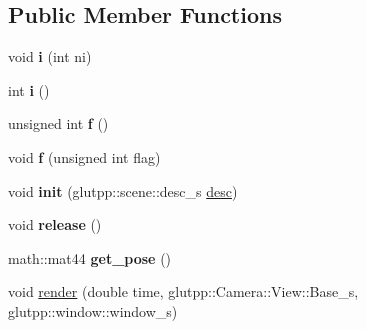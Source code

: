\subsection*{\-Public \-Member \-Functions}
\begin{DoxyCompactItemize}
\item 
\hypertarget{classglutpp_1_1scene_1_1scene_abe1fa6d1512bfd84e91f9192e7c743ca}{void {\bfseries i} (int ni)}\label{classglutpp_1_1scene_1_1scene_abe1fa6d1512bfd84e91f9192e7c743ca}

\item 
\hypertarget{classglutpp_1_1scene_1_1scene_abbc88704970f055844e5f06453178dcb}{int {\bfseries i} ()}\label{classglutpp_1_1scene_1_1scene_abbc88704970f055844e5f06453178dcb}

\item 
\hypertarget{classglutpp_1_1scene_1_1scene_acb8ef22577d6d70aef89faf02c671d77}{unsigned int {\bfseries f} ()}\label{classglutpp_1_1scene_1_1scene_acb8ef22577d6d70aef89faf02c671d77}

\item 
\hypertarget{classglutpp_1_1scene_1_1scene_a25b3ffec412aa55a88d4c4fb6a1c7a3b}{void {\bfseries f} (unsigned int flag)}\label{classglutpp_1_1scene_1_1scene_a25b3ffec412aa55a88d4c4fb6a1c7a3b}

\item 
\hypertarget{classglutpp_1_1scene_1_1scene_ac204eb31618e2fd30c962c49e3767e25}{void {\bfseries init} (glutpp\-::scene\-::desc\-\_\-s \hyperlink{classglutpp_1_1scene_1_1desc}{desc})}\label{classglutpp_1_1scene_1_1scene_ac204eb31618e2fd30c962c49e3767e25}

\item 
\hypertarget{classglutpp_1_1scene_1_1scene_a5de02f6d7763af6ad7b5fb8e57499a65}{void {\bfseries release} ()}\label{classglutpp_1_1scene_1_1scene_a5de02f6d7763af6ad7b5fb8e57499a65}

\item 
\hypertarget{classglutpp_1_1scene_1_1scene_aa27e95117fb9b51657be1a2d29acdaba}{math\-::mat44 {\bfseries get\-\_\-pose} ()}\label{classglutpp_1_1scene_1_1scene_aa27e95117fb9b51657be1a2d29acdaba}

\item 
\hypertarget{classglutpp_1_1scene_1_1scene_ab785a0fe5fbb72652a7e96d4ae9f5c4e}{void \hyperlink{classglutpp_1_1scene_1_1scene_ab785a0fe5fbb72652a7e96d4ae9f5c4e}{render} (double time, glutpp\-::\-Camera\-::\-View\-::\-Base\-\_\-s, glutpp\-::window\-::window\-\_\-s)}\label{classglutpp_1_1scene_1_1scene_ab785a0fe5fbb72652a7e96d4ae9f5c4e}


\end{DoxyCompactItemize}
